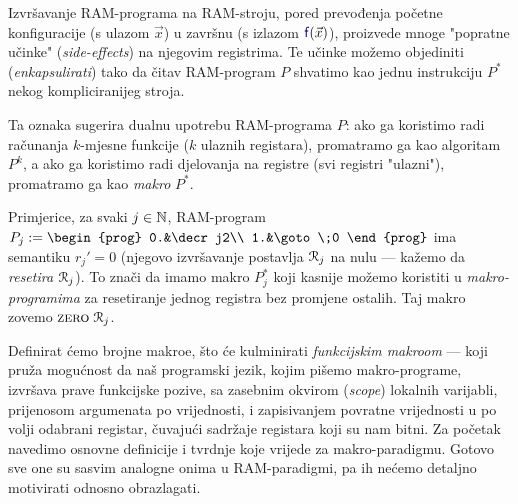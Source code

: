 Izvršavanje RAM-programa na RAM-stroju, pored prevođenja početne konfiguracije (s ulazom $\vec x$) u završnu (s izlazom $\f{f}(\vec x)$), proizvede mnoge "popratne učinke" (\emph{side-effects}) na njegovim registrima. Te učinke možemo objediniti (\emph{enkapsulirati}) tako da čitav RAM-program $P$ shvatimo kao jednu instrukciju $P^*$ nekog kompliciranijeg stroja. 

Ta oznaka sugerira dualnu upotrebu RAM-programa $P$: ako ga koristimo radi računanja $k$-mjesne funkcije ($k$ ulaznih registara), promatramo ga kao algoritam $P^k$, a ako ga koristimo radi djelovanja na registre (svi registri "ulazni"), promatramo ga kao \emph{makro} $P^*$.

Primjerice, za svaki $j\in{\mathbb N}$, RAM-program $P_j:=\begin{prog}
0.&\decr j2\\
1.&\goto\;0
\end{prog}$ ima semantiku $r_j'=0$ (njegovo izvršavanje postavlja $\mathcal R_{j}$ na nulu --- kažemo da \emph{resetira} $\mathcal R_{j}$). To znači da imamo makro $P_j^*$ koji kasnije možemo koristiti u \emph{makro-programima} za resetiranje jednog registra bez promjene ostalih. Taj makro zovemo $\textsc{zero}\;\mathcal R_{j}$.

Definirat ćemo brojne makroe, što će kulminirati \emph{funkcijskim makroom} --- koji pruža mogućnost da naš programski jezik, kojim pišemo makro-programe, izvršava prave funkcijske pozive, sa zasebnim okvirom (\emph{scope}) lokalnih varijabli, prijenosom argumenata po vrijednosti, i zapisivanjem povratne vrijednosti u po volji odabrani registar, čuvajući sadržaje registara koji su nam bitni. Za početak navedimo osnovne definicije i tvrdnje koje vrijede za makro-paradigmu. Gotovo sve one su sasvim analogne onima u RAM-paradigmi, pa ih nećemo detaljno motivirati odnosno obrazlagati.

